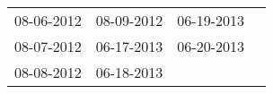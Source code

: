 \begin{supertabular}{llll}
 08-06-2012 &  08-09-2012 &  06-19-2013 \\
 08-07-2012 &  06-17-2013 &  06-20-2013 \\
 08-08-2012 &  06-18-2013 &             \\
\end{supertabular}
